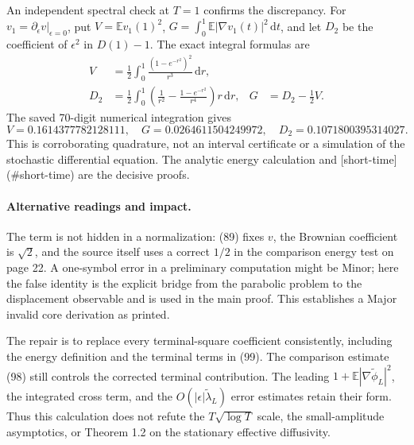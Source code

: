 \documentclass[10pt]{article}
\begin{document}
An independent spectral check at \(T=1\) confirms the discrepancy. For \(v_1=\partial_\epsilon v|_{\epsilon=0}\), put \(V=\mathbb Ev_1(1)^2\), \(G=\int_0^1\mathbb E|\nabla v_1(t)|^2\,\mathrm dt\), and let \(D_2\) be the coefficient of \(\epsilon^2\) in \(D(1)-1\). The exact integral formulas are \[\begin{aligned}
 V&=\frac12\int_0^1
      \frac{(1-e^{-r^2})^2}{r^3}\,\mathrm dr,\\
 D_2&=\frac12\int_0^1
      \left(\frac1{r^2}-\frac{1-e^{-r^2}}{r^4}\right)r\,\mathrm dr,
 &G&=D_2-\frac12V.\end{aligned}\] The saved 70-digit numerical integration gives \[V=0.1614377782128111,\quad
 G=0.0264611504249972,\quad
 D_2=0.1071800395314027.\] This is corroborating quadrature, not an interval certificate or a simulation of the stochastic differential equation. The analytic energy calculation and [short-time] (\#short-time) are the decisive proofs.\par
\paragraph*{Alternative readings and impact.}\mbox{}\par
The term is not hidden in a normalization: (89) fixes \(v\), the Brownian coefficient is \(\sqrt2\), and the source itself uses a correct \(1/2\) in the comparison energy test on page 22. A one-symbol error in a preliminary computation might be Minor; here the false identity is the explicit bridge from the parabolic problem to the displacement observable and is used in the main proof. This establishes a Major invalid core derivation as printed.\par
The repair is to replace every terminal-square coefficient consistently, including the energy definition and the terminal terms in (99). The comparison estimate (98) still controls the corrected terminal contribution. The leading \(1+\mathbb E|\nabla\widetilde\phi_L|^2\), the integrated cross term, and the \(O(|\epsilon|\widetilde\lambda_L)\) error estimates retain their form. Thus this calculation does not refute the \(T\sqrt{\log T}\) scale, the small-amplitude asymptotics, or Theorem 1.2 on the stationary effective diffusivity.\par
\end{document}

